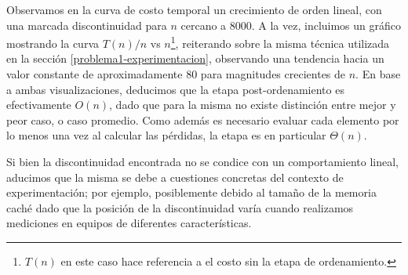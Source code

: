 Observamos en la curva de costo temporal un crecimiento de orden lineal, con una marcada discontinuidad para $n$ cercano a $8000$. A la vez, incluimos un gráfico mostrando la curva $T(n) / n$ vs $n$\footnote{$T(n)$ en este caso hace referencia a el costo sin la etapa de ordenamiento.}, reiterando sobre la misma técnica utilizada en la sección \ref{problema1-experimentacion}, observando una tendencia hacia un valor constante de aproximadamente $80$ para magnitudes crecientes de $n$. En base a ambas visualizaciones, deducimos que la etapa post-ordenamiento es efectivamente $O(n)$, dado que para la misma no existe distinción entre mejor y peor caso, o caso promedio. Como además es necesario evaluar cada elemento por lo menos una vez al calcular las pérdidas, la etapa es en particular $\Theta(n)$.

Si bien la discontinuidad encontrada no se condice con un comportamiento lineal, aducimos que la misma se debe a cuestiones concretas del contexto de experimentación; por ejemplo, posiblemente debido al tamaño de la memoria caché dado que la posición de la discontinuidad varía cuando realizamos mediciones en equipos de diferentes características.



